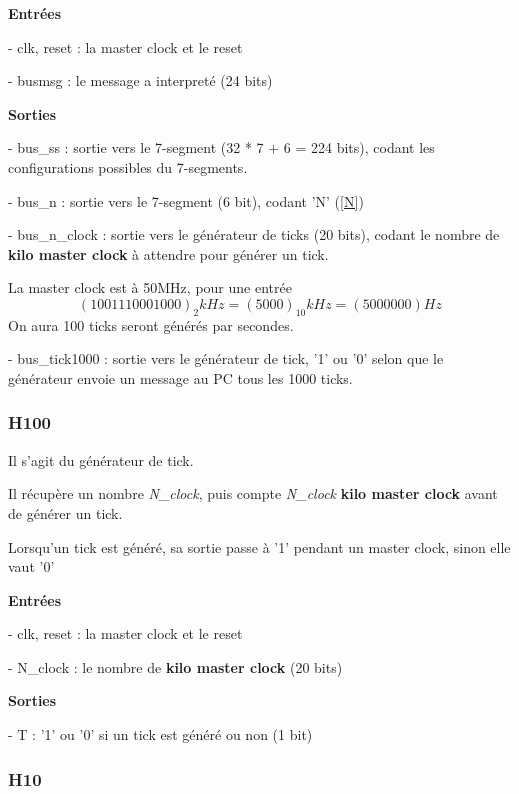 \documentclass[10pt]{article}
\begin{document}
        \textbf{Entrées}
        
            - clk, reset : la master clock et le reset
            
            - busmsg : le message a interpreté (24 bits)
                            
        \textbf{Sorties}
            
            - bus\_ss : sortie vers le 7-segment (32 * 7 + 6 = 224 bits), codant les configurations possibles du 7-segments.
           
            - bus\_n : sortie vers le 7-segment (6 bit), codant 'N' (\ref{N})

            - bus\_n\_clock : sortie vers le générateur de ticks (20 bits), codant le nombre de \textbf{kilo master clock} à attendre pour générer un tick.
            
            La master clock est à 50MHz, pour une entrée
            $$(1001110001000)_2 kHz = (5000)_{10} kHz = (5000000) Hz$$
            On aura 100 ticks seront générés par secondes.
            
            - bus\_tick1000 : sortie vers le générateur de tick, '1' ou '0' selon que le générateur envoie un message au PC tous les 1000 ticks.

        
        \subsubsection{H100}
        
        Il s'agit du générateur de tick.
                
        Il récupère un nombre \textit{N\_clock}, puis compte \textit{N\_clock} \textbf{kilo master clock}
        avant de générer un tick.
        
        Lorsqu'un tick est généré, sa sortie passe à '1' pendant un master clock, sinon elle vaut '0'
        
        \textbf{Entrées}
        
            - clk, reset : la master clock et le reset
            
            - N\_clock : le nombre de \textbf{kilo master clock} (20 bits)
                            
        \textbf{Sorties}
            
            - T : '1' ou '0' si un tick est généré ou non (1 bit)
        
        \subsubsection{H10}
        
\end{document}
